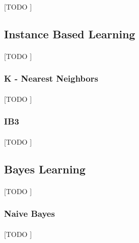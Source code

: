 \documentclass{article}
\begin{document}
				\paragraph{}
				[TODO ]

		\subsection{Instance Based Learning}
		\label{sec:decision-trees}

			\paragraph{}
			[TODO ]

			\subsubsection{K - Nearest Neighbors}
			\label{sec:knn}

				\paragraph{}
				[TODO ]

			\subsubsection{IB3}
			\label{sec:ib3}

				\paragraph{}
				[TODO ]

		\subsection{Bayes Learning}
		\label{sec:decision-trees}

			\paragraph{}
			[TODO ]

			\subsubsection{Naive Bayes}
			\label{sec:naive-bayes}

				\paragraph{}
				[TODO ]
\end{document}

